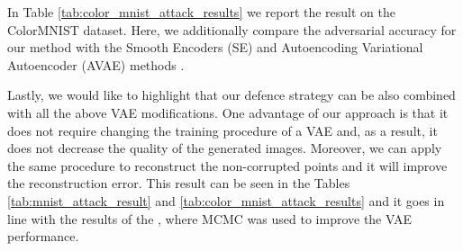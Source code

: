 {In Table \ref{tab:color_mnist_attack_results} we report the result on the ColorMNIST dataset. Here, we additionally compare the adversarial accuracy for our method with the Smooth Encoders (SE) and Autoencoding Variational Autoencoder (AVAE) methods \cite{cemgil2020autoencoding, Cemgil2019-vn}.

Lastly, we would like to highlight that our defence strategy can be also combined with all the above VAE modifications. One advantage of our approach is that it does not require changing the training procedure of a VAE and, as a result, it does not decrease the quality of the generated images. 
Moreover, we can apply the same procedure to reconstruct the non-corrupted points and it will improve the reconstruction error. 
This result can be seen in the Tables \ref{tab:mnist_attack_result} and \ref{tab:color_mnist_attack_results} and it goes in line with the results of the \citet{salimans2015markov}, where MCMC was used to improve the VAE performance. 


 


}
